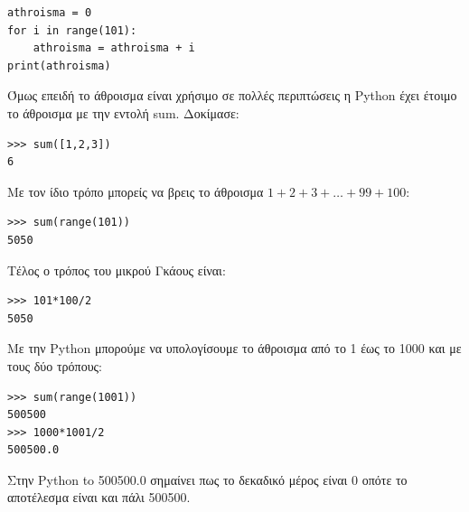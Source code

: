 \documentclass[b5paper,11pt,twoside,openleft]{memoir}
\begin{document}
\begin{lstlisting}
athroisma = 0
for i in range(101):
    athroisma = athroisma + i
print(athroisma)
\end{lstlisting}

Όμως επειδή το άθροισμα είναι χρήσιμο σε πολλές περιπτώσεις η Python έχει έτοιμο το άθροισμα με την εντολή sum. Δοκίμασε:
\begin{lstlisting}
>>> sum([1,2,3])
6
\end{lstlisting}

Με τον ίδιο τρόπο μπορείς να βρεις το άθροισμα $1 + 2 + 3+ \ldots + 99 + 100$:
\begin{lstlisting}
>>> sum(range(101))
5050
\end{lstlisting}

Τέλος ο τρόπος του μικρού Γκάους είναι:
\begin{lstlisting}
>>> 101*100/2
5050
\end{lstlisting}

Με την Python μπορούμε να υπολογίσουμε το άθροισμα από το 1 έως το 1000 και με τους δύο τρόπους:
\begin{lstlisting}
>>> sum(range(1001))
500500
>>> 1000*1001/2
500500.0
\end{lstlisting}
Στην Python to 500500.0 σημαίνει πως το δεκαδικό μέρος είναι 0 οπότε το αποτέλεσμα είναι και πάλι 500500.



%
%
%
%
%
%
%
%
\end{document}

